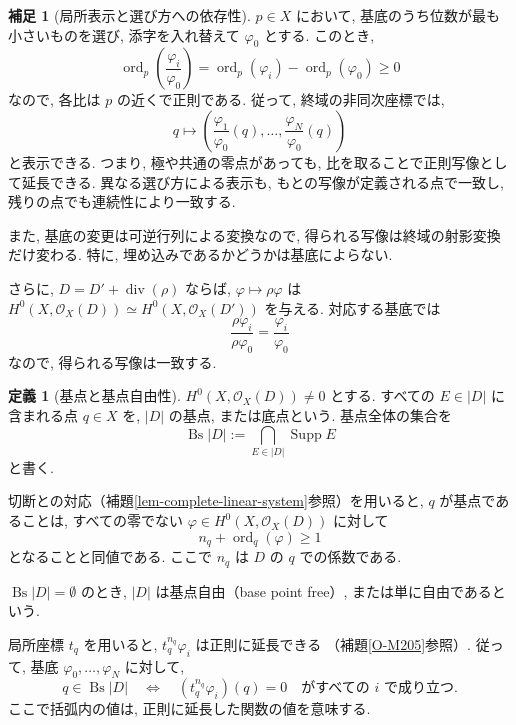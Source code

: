 \documentclass[dvipdfmx,a4paper,11pt]{article} %
\theoremstyle{definition}
\numberwithin{equation}{section}
\newtheorem{dfn}[thm]{定義}
\newtheorem{rem}[thm]{補足}
\begin{document}
\begin{rem}[局所表示と選び方への依存性]\label{O-M328}
$p\in X$ において, 基底のうち位数が最も小さいものを選び,
添字を入れ替えて $\varphi_0$ とする.
このとき,
\[
\operatorname{ord}_p\left(\frac{\varphi_i}{\varphi_0}\right)
=\operatorname{ord}_p(\varphi_i)-\operatorname{ord}_p(\varphi_0)\geq0
\]
なので, 各比は $p$ の近くで正則である.
従って, 終域の非同次座標では,
\begin{equation}\label{O-EQ096}
q\longmapsto
\left(
\frac{\varphi_1}{\varphi_0}(q),\ldots,
\frac{\varphi_N}{\varphi_0}(q)
\right)
\end{equation}
と表示できる.
つまり, 極や共通の零点があっても,
比を取ることで正則写像として延長できる.
異なる選び方による表示も, もとの写像が定義される点で一致し,
残りの点でも連続性により一致する.

また, 基底の変更は可逆行列による変換なので,
得られる写像は終域の射影変換だけ変わる.
特に, 埋め込みであるかどうかは基底によらない.

さらに, $D=D'+\operatorname{div}(\rho)$ ならば,
$\varphi\mapsto\rho\varphi$ は
$H^0(X,\mathcal O_X(D))\simeq H^0(X,\mathcal O_X(D'))$
を与える.
対応する基底では
\[
\frac{\rho\varphi_i}{\rho\varphi_0}
=\frac{\varphi_i}{\varphi_0}
\]
なので, 得られる写像は一致する.
\end{rem}

\begin{dfn}[基点と基点自由性]\label{O-M329}\label{O-M331}
$H^0(X,\mathcal O_X(D))\neq0$ とする.
すべての $E\in|D|$ に含まれる点 $q\in X$ を,
$|D|$ の基点, または底点という.
基点全体の集合を
\[
\operatorname{Bs}|D|
:=\bigcap_{E\in|D|}\operatorname{Supp}E
\]
と書く.

切断との対応（補題\ref{lem-complete-linear-system}参照）を用いると,
$q$ が基点であることは,
すべての零でない $\varphi\in H^0(X,\mathcal O_X(D))$ に対して
\[
n_q+\operatorname{ord}_q(\varphi)\geq1
\]
となることと同値である.
ここで $n_q$ は $D$ の $q$ での係数である.

$\operatorname{Bs}|D|=\emptyset$ のとき,
$|D|$ は基点自由（base point free）, または単に自由であるという.
\end{dfn}

局所座標 $t_q$ を用いると,
$t_q^{n_q}\varphi_i$ は正則に延長できる
（補題\ref{O-M205}参照）.
従って, 基底 $\varphi_0,\ldots,\varphi_N$ に対して,
\[
q\in\operatorname{Bs}|D|
\quad\Longleftrightarrow\quad
(t_q^{n_q}\varphi_i)(q)=0
\quad\text{がすべての }i\text{ で成り立つ}.
\]
ここで括弧内の値は, 正則に延長した関数の値を意味する.
\end{document}
